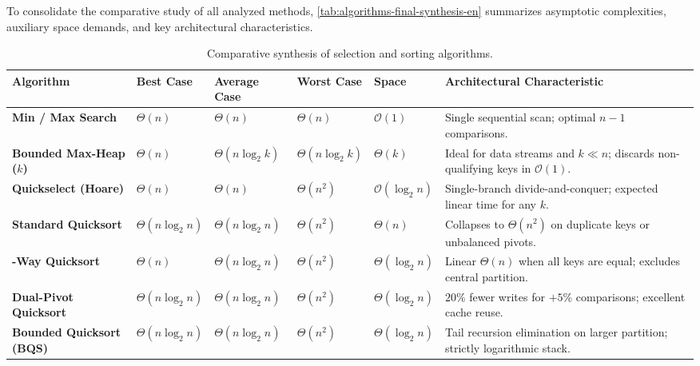 To consolidate the comparative study of all analyzed methods, \autoref{tab:algorithms-final-synthesis-en} summarizes asymptotic complexities, auxiliary space demands, and key architectural characteristics.

\begin{table}[H]
  \centering
  \footnotesize
  \caption{Comparative synthesis of selection and sorting algorithms.}
  \label{tab:algorithms-final-synthesis-en}
  \begin{tabularx}{\textwidth}{@{}>{\bfseries\arraybackslash}p{}>{\centering\arraybackslash}p{}>{\centering\arraybackslash}p{}>{\centering\arraybackslash}p{}>{\centering\arraybackslash}p{}Y@{}}
    \toprule
    Algorithm & Best Case & Average Case & Worst Case & Space & Architectural Characteristic \\
    \midrule
    Min / Max Search & $\Theta(n)$ & $\Theta(n)$ & $\Theta(n)$ & $\mathcal{O}(1)$ & Single sequential scan; optimal $n-1$ comparisons. \\
    \addlinespace
    Bounded Max-Heap ($k$) & $\Theta(n)$ & $\Theta(n \log_2 k)$ & $\Theta(n \log_2 k)$ & $\Theta(k)$ & Ideal for data streams and $k \ll n$; discards non-qualifying keys in $\mathcal{O}(1)$. \\
    \addlinespace
    Quickselect (Hoare) & $\Theta(n)$ & $\Theta(n)$ & $\Theta(n^2)$ & $\mathcal{O}(\log_2 n)$ & Single-branch divide-and-conquer; expected linear time for any $k$. \\
    \addlinespace
    Standard Quicksort & $\Theta(n \log_2 n)$ & $\Theta(n \log_2 n)$ & $\Theta(n^2)$ & $\Theta(n)$ & Collapses to $\Theta(n^2)$ on duplicate keys or unbalanced pivots. \\
    -Way Quicksort & $\Theta(n)$ & $\Theta(n \log_2 n)$ & $\Theta(n^2)$ & $\Theta(\log_2 n)$ & Linear $\Theta(n)$ when all keys are equal; excludes central partition. \\
    \addlinespace
    Dual-Pivot Quicksort & $\Theta(n \log_2 n)$ & $\Theta(n \log_2 n)$ & $\Theta(n^2)$ & $\Theta(\log_2 n)$ & $20\%$ fewer writes for $+5\%$ comparisons; excellent cache reuse. \\
    \addlinespace
    Bounded Quicksort (BQS) & $\Theta(n \log_2 n)$ & $\Theta(n \log_2 n)$ & $\Theta(n^2)$ & $\Theta(\log_2 n)$ & Tail recursion elimination on larger partition; strictly logarithmic stack. \\
    \bottomrule
  \end{tabularx}
\end{table}


